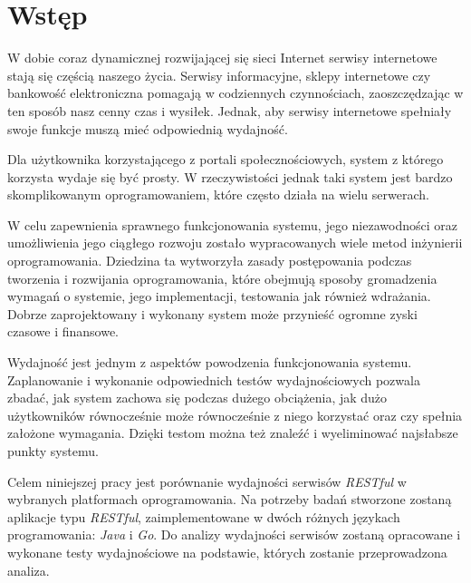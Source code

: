 \chapter{Wstęp}

W dobie coraz dynamicznej rozwijającej się sieci Internet serwisy internetowe stają się częścią  naszego życia. Serwisy informacyjne, sklepy internetowe czy bankowość elektroniczna pomagają w codziennych czynnościach,  zaoszczędzając w ten sposób nasz cenny czas i wysiłek. Jednak, aby  serwisy internetowe spełniały swoje funkcje muszą  mieć odpowiednią wydajność. 

Dla użytkownika korzystającego z portali społecznościowych, system z którego korzysta wydaje się być prosty. W rzeczywistości jednak taki system jest bardzo skomplikowanym oprogramowaniem, które często działa na wielu serwerach.

W celu zapewnienia sprawnego funkcjonowania  systemu, jego niezawodności oraz umożliwienia jego ciągłego rozwoju zostało wypracowanych wiele metod inżynierii oprogramowania. Dziedzina ta wytworzyła zasady postępowania podczas tworzenia i rozwijania oprogramowania, które obejmują sposoby gromadzenia wymagań o systemie, jego implementacji, testowania jak również wdrażania. Dobrze zaprojektowany i wykonany system może przynieść ogromne zyski czasowe i finansowe. 

Wydajność jest jednym z aspektów powodzenia funkcjonowania systemu. Zaplanowanie i wykonanie odpowiednich testów wydajnościowych pozwala zbadać, jak system zachowa się podczas dużego obciążenia, jak dużo użytkowników równocześnie może równocześnie z niego korzystać oraz czy spełnia założone wymagania. Dzięki testom można też znaleźć i wyeliminować najsłabsze punkty systemu.

Celem niniejszej pracy jest  porównanie wydajności serwisów  \textsl{RESTful} w wybranych platformach oprogramowania. Na potrzeby badań  stworzone zostaną aplikacje typu \textsl{RESTful}, zaimplementowane  w dwóch różnych językach programowania: \textsl{Java} i \textsl{Go}.  Do analizy wydajności serwisów zostaną opracowane i wykonane testy wydajnościowe na podstawie, których zostanie przeprowadzona analiza.
